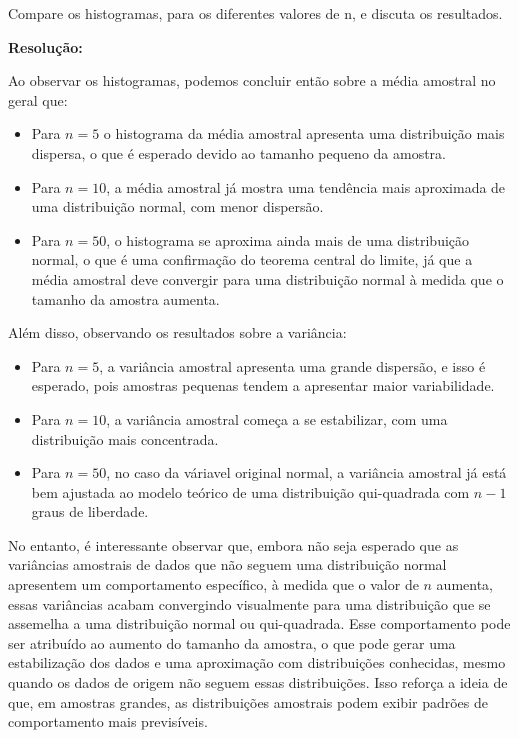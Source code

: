 \documentclass[]{abntex2}
\begin{document}
\noindent Compare os histogramas, para os diferentes valores de n, e discuta os resultados.

\textbf{Resolução:}

Ao observar os histogramas, podemos concluir então sobre a média amostral no geral que:

\begin{itemize}
    \item Para \(n = 5\) o histograma da média amostral apresenta uma distribuição mais dispersa, o que é esperado devido ao tamanho pequeno da amostra.
    \item Para \(n = 10\), a média amostral já mostra uma tendência mais aproximada de uma distribuição normal, com menor dispersão.
    \item Para \(n = 50\), o histograma se aproxima ainda mais de uma distribuição normal, o que é uma confirmação do teorema central do limite, já que a média amostral deve convergir para uma distribuição normal à medida que o tamanho da amostra aumenta.
\end{itemize}

Além disso, observando os resultados sobre a variância:

\begin{itemize}
    \item Para \(n = 5\), a variância amostral apresenta uma grande dispersão, e isso é esperado, pois amostras pequenas tendem a apresentar maior variabilidade.
    \item Para \(n = 10\), a variância amostral começa a se estabilizar, com uma distribuição mais concentrada.
    \item Para \(n = 50\), no caso da váriavel original normal, a variância amostral já está bem ajustada ao modelo teórico de uma distribuição qui-quadrada com \(n -1\) graus de liberdade.
\end{itemize}

No entanto, é interessante observar que, embora não seja esperado que as variâncias amostrais de dados que não seguem uma distribuição normal apresentem um comportamento específico, à medida que o valor de \(n\) aumenta, essas variâncias acabam convergindo visualmente para uma distribuição que se assemelha a uma distribuição normal ou qui-quadrada. Esse comportamento pode ser atribuído ao aumento do tamanho da amostra, o que pode gerar uma estabilização dos dados e uma aproximação com distribuições conhecidas, mesmo quando os dados de origem não seguem essas distribuições. Isso reforça a ideia de que, em amostras grandes, as distribuições amostrais podem exibir padrões de comportamento mais previsíveis. 
\end{document}
